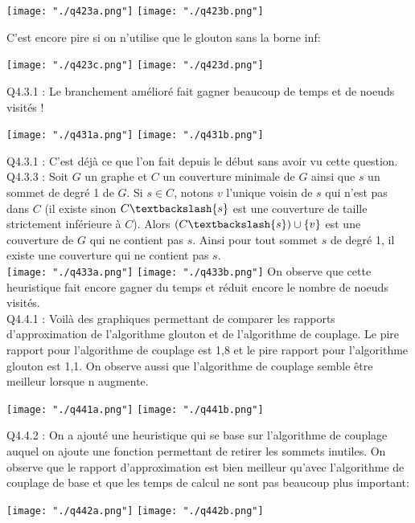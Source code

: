 \documentclass[a4paper]{article}
\begin{document}
\texttt{[image: "./q423a.png"]}
\texttt{[image: "./q423b.png"]}

C'est encore pire si on n'utilise que le glouton sans la borne inf:

\texttt{[image: "./q423c.png"]}
\texttt{[image: "./q423d.png"]}

Q4.3.1 : 
Le branchement amélioré fait gagner beaucoup de temps et de noeuds visités !

\texttt{[image: "./q431a.png"]}
\texttt{[image: "./q431b.png"]}

Q4.3.1 : 
C'est déjà ce que l'on fait depuis le début sans avoir vu cette question. \\

Q4.3.3 :
Soit $G$ un graphe et $C$ un couverture minimale de $G$ ainsi que $s$ un sommet de degré 1 de $G$. Si $s \in C$, notons $v$ l'unique voisin de $s$ qui n'est pas dans $C$ (il existe sinon $C\textbackslash\{s\}$ est une couverture de taille strictement inférieure à $C$). Alors $(C\textbackslash\{s\}) \cup \{v\}$ est une couverture de $G$ qui ne contient pas $s$. Ainsi pour tout sommet $s$ de degré 1, il existe une couverture qui ne contient pas $s$. \\
\texttt{[image: "./q433a.png"]}
\texttt{[image: "./q433b.png"]}
On observe que cette heuristique fait encore gagner du temps et réduit encore le nombre de noeuds visités. \\

Q4.4.1 : 
Voilà des graphiques permettant de comparer les rapports d'approximation de l'algorithme glouton et de l'algorithme de couplage. Le pire rapport pour l'algorithme de couplage est 1,8 et le pire rapport pour l'algorithme glouton est 1,1. On observe aussi que l'algorithme de couplage semble être meilleur lorsque n augmente.

\texttt{[image: "./q441a.png"]}
\texttt{[image: "./q441b.png"]}

Q4.4.2 :
On a ajouté une heuristique qui se base sur l'algorithme de couplage auquel on ajoute une fonction permettant de retirer les sommets inutiles. On observe que le rapport d'approximation est bien meilleur qu'avec l'algorithme de couplage de base et que les temps de calcul ne sont pas beaucoup plus important:

\texttt{[image: "./q442a.png"]}
\texttt{[image: "./q442b.png"]}
\end{document}
